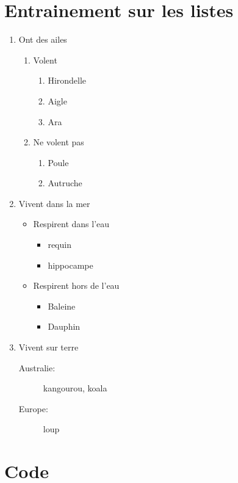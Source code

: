 \documentclass[12pt,a4paper]{scrartcl}
\theoremstyle{plain}
\begin{document}
\section{Entrainement sur les listes}
\begin{enumerate}
\item Ont des ailes
	\begin{enumerate}
	\item Volent
		\begin{enumerate}
		\item Hirondelle
		\item Aigle
		\item Ara
		\end{enumerate}
	\item Ne volent pas
		\begin{enumerate}
		\item Poule
		\item Autruche
		\end{enumerate}
	\end{enumerate}
	
\item Vivent dans la mer
	\begin{itemize}
	\item Respirent dans l'eau
		\begin{itemize}
		\item requin
		\item hippocampe
		\end{itemize}
	\item Respirent hors de l'eau
		\begin{itemize}
		\item Baleine
		\item Dauphin
		\end{itemize}
	\end{itemize}
	
\item Vivent sur terre
	\begin{description}
	\item[Australie:] kangourou, koala
	\item[Europe:] loup
	\end{description}	 
\end{enumerate}

\section{Code}


\end{document}
